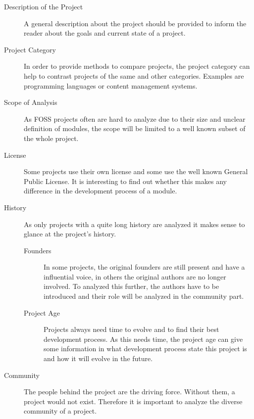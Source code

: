 \begin{description}

  \item[Description of the Project] A general description about the project
    should be provided to inform the reader about the goals and current state
    of a project.

  \item[Project Category] In order to provide methods to compare projects, the
    project category can help to contrast projects of the same and other
    categories. Examples are programming languages or content management
    systems.

  \item[Scope of Analysis] As FOSS projects often are hard to analyze due to
    their size and unclear definition of modules, the scope will be limited to
    a well known subset of the whole project.

  \item[License] Some projects use their own license and some use the well
    known General Public License. It is interesting to find out whether this
    makes any difference in the development process of a module.

  \item[History] As only projects with a quite long history are analyzed it
    makes sense to glance at the project's history.

  \begin{description}

    \item[Founders] In some projects, the original founders are still present
      and have a influential voice, in others the original authors are no
      longer involved. To analyzed this further, the authors have to be
      introduced and their role will be analyzed in the community part.

    \item[Project Age] Projects always need time to evolve and to find their
      best development process. As this needs time, the project age can give
      some information in what development process state this project is and
      how it will evolve in the future.

  \end{description}

  \item[Community] The people behind the project are the driving force. Without
    them, a project would not exist. Therefore it is important to analyze the
    diverse community of a project.


\end{description}
